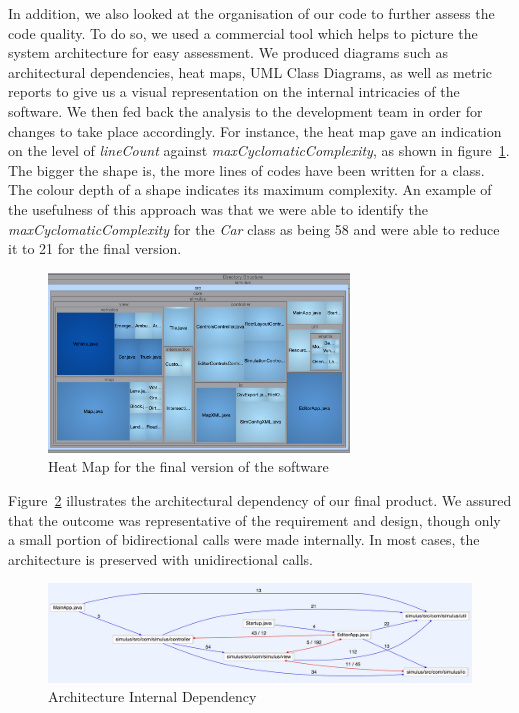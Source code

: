 In addition, we also looked at the organisation of our code to further assess the code quality. To do so, we used a commercial tool which helps to picture the system architecture for easy assessment. We produced diagrams such as architectural dependencies, heat maps, UML Class Diagrams, as well as metric reports to give us a visual representation on the internal intricacies of the software. We then fed back the analysis to the development team in order for changes to take place accordingly. For instance, the heat map gave an indication on the level of \textit{lineCount} against \textit{maxCyclomaticComplexity}, as shown in figure~\ref{fig:heatmap}. The bigger the shape is, the more lines of codes have been written for a class. The colour depth of a shape indicates its maximum complexity. An example of the usefulness of this approach was that we were able to identify the \textit{maxCyclomaticComplexity} for the \textit{Car} class as being 58 and were able to reduce it to 21 for the final version.     

\begin{figure}[h]
        \begin{minipage}{\textwidth}
                \begin{center}
                                \includegraphics[width=80mm,keepaspectratio ]{img/heatmap.png}
                        \caption{Heat Map for the final version of the software}
                        \label{fig:heatmap}     
                \end{center}
        \end{minipage}
\end{figure}

Figure~\ref{fig:archIntDependency} illustrates the architectural dependency of our final product. We assured that the outcome was representative of the requirement and design, though only a small portion of bidirectional calls were made internally. In most cases, the architecture is preserved with unidirectional calls.

\begin{figure}[h]
        \begin{center}
             \includegraphics[width=\textwidth]{img/archIntDependency.png}
        \caption{Architecture Internal Dependency}
        \label{fig:archIntDependency}
        \end{center}
\end{figure}